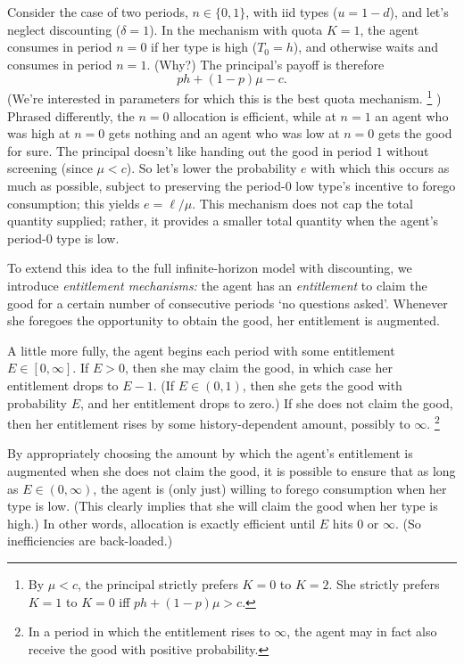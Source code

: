 Consider the case of two periods, $n \in \{0,1\}$, 
with iid types ($u = 1-d$),
and let's neglect discounting ($\delta=1$).
In the mechanism with quota $K=1$,
the agent consumes in period $n=0$ if her type is high ($T_0=h$),
and otherwise waits and consumes in period $n=1$. (Why?)
The principal's payoff is therefore
%
\begin{equation*}
	p h + (1-p) \mu - c.
\end{equation*}
%
(We're interested in parameters for which this is the best quota mechanism.%
	\footnote{By $\mu<c$, the principal strictly prefers $K=0$ to $K=2$.
	She strictly prefers $K=1$ to $K=0$ iff $p h + (1-p) \mu > c$.}%
)
Phrased differently, the $n=0$ allocation is efficient,
while at $n=1$ an agent who was high at $n=0$ gets nothing
and an agent who was low at $n=0$ gets the good for sure.
The principal doesn't like handing out the good in period $1$ without screening (since $\mu < c$).
So let's lower the probability $e$ with which this occurs
as much as possible, subject to preserving the period-$0$ low type's incentive to forego consumption; this yields $e = \ell / \mu$.
This mechanism does not cap the total quantity supplied; rather, it provides a smaller total quantity when the agent's period-$0$ type is low.


To extend this idea to the full infinite-horizon model with discounting,
we introduce \emph{entitlement mechanisms:}
the agent has an \emph{entitlement} to claim the good for a certain number of consecutive periods `no questions asked'.
Whenever she foregoes the opportunity to obtain the good, her entitlement is augmented.

A little more fully, the agent begins each period with some entitlement $E \in [0,\infty]$.
If $E>0$, then she may claim the good, in which case her entitlement drops to $E-1$.
(If $E \in (0,1)$, then she gets the good with probability $E$, and her entitlement drops to zero.)
If she does not claim the good, then her entitlement rises by some history-dependent amount, possibly to $\infty$.%
	\footnote{In a period in which the entitlement rises to $\infty$, the agent may in fact also receive the good with positive probability.}

By appropriately choosing the amount by which the agent's entitlement is augmented when she does not claim the good, it is possible to ensure that as long as $E \in (0,\infty)$, the agent is (only just) willing to forego consumption when her type is low. (This clearly implies that she will claim the good when her type is high.)
In other words, allocation is exactly efficient until $E$ hits $0$ or $\infty$.
(So inefficiencies are back-loaded.)

